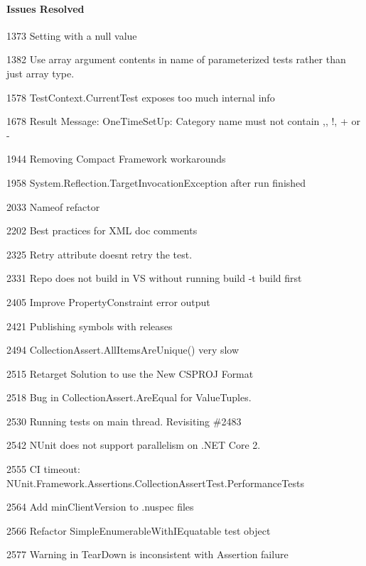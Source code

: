 \paragraph*{Issues Resolved}


\begin{DoxyItemize}
\item 1373 Setting with a null value
\item 1382 Use array argument contents in name of parameterized tests rather than just array type.
\item 1578 Test\+Context.\+Current\+Test exposes too much internal info
\item 1678 Result Message\+: One\+Time\+Set\+Up\+: Category name must not contain \textquotesingle{},\textquotesingle{}, \textquotesingle{}!\textquotesingle{}, \textquotesingle{}+\textquotesingle{} or \textquotesingle{}-\/\textquotesingle{}
\item 1944 Removing Compact Framework workarounds
\item 1958 System.\+Reflection.\+Target\+Invocation\+Exception after run finished
\item 2033 Nameof refactor
\item 2202 Best practices for X\+ML doc comments
\item 2325 Retry attribute doesn\textquotesingle{}t retry the test.
\item 2331 Repo does not build in VS without running {\ttfamily build -\/t build} first
\item 2405 Improve Property\+Constraint error output
\item 2421 Publishing symbols with releases
\item 2494 Collection\+Assert.\+All\+Items\+Are\+Unique() very slow
\item 2515 Retarget Solution to use the New C\+S\+P\+R\+OJ Format
\item 2518 Bug in Collection\+Assert.\+Are\+Equal for Value\+Tuples.
\item 2530 Running tests on main thread. Revisiting \#2483
\item 2542 N\+Unit does not support parallelism on .N\+ET Core 2.
\item 2555 CI timeout\+: N\+Unit.\+Framework.\+Assertions.\+Collection\+Assert\+Test.\+Performance\+Tests
\item 2564 Add min\+Client\+Version to .nuspec files
\item 2566 Refactor {\ttfamily Simple\+Enumerable\+With\+I\+Equatable} test object
\item 2577 Warning in Tear\+Down is inconsistent with Assertion failure

\end{DoxyItemize}
